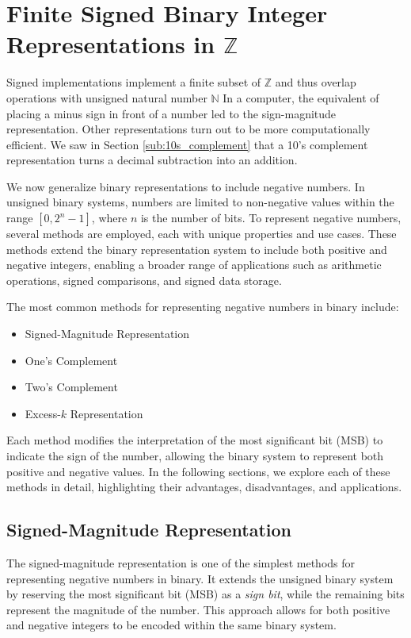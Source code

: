 \chapter{Finite Signed Binary Integer Representations in $\mathbb{Z}$}
\localtoc
Signed implementations implement a finite subset of $\mathbb{Z}$ and thus overlap operations with unsigned natural number $\mathbb{N}$ In a computer, the equivalent of placing a minus sign in front of a number led to the sign-magnitude representation. Other representations turn out to be more computationally efficient.  We saw in Section \ref{sub:10s_complement} that a 10's complement representation turns a decimal subtraction into an addition. 

We now generalize binary representations to include negative numbers. In unsigned binary systems, numbers are limited to non-negative values within the range \( [0, 2^n - 1] \), where \( n \) is the number of bits. To represent negative numbers, several methods are employed, each with unique properties and use cases. These methods extend the binary representation system to include both positive and negative integers, enabling a broader range of applications such as arithmetic operations, signed comparisons, and signed data storage.

The most common methods for representing negative numbers in binary include:
\begin{itemize}
    \item Signed-Magnitude Representation
    \item One's Complement
    \item Two's Complement
    \item Excess-\( k \) Representation
\end{itemize}

Each method modifies the interpretation of the most significant bit (MSB) to indicate the sign of the number, allowing the binary system to represent both positive and negative values. In the following sections, we explore each of these methods in detail, highlighting their advantages, disadvantages, and applications.

\section{Signed-Magnitude Representation}
The signed-magnitude representation is one of the simplest methods for representing negative numbers in binary. It extends the unsigned binary system by reserving the most significant bit (MSB) as a \textit{sign bit}, while the remaining bits represent the magnitude of the number. This approach allows for both positive and negative integers to be encoded within the same binary system.


